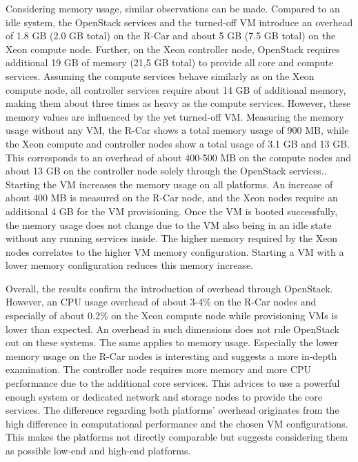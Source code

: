         \noindent Considering memory usage, similar observations can be made.
        Compared to an idle system, the OpenStack services and the turned-off VM introduce an overhead of 1.8 GB (2.0 GB total)  on the R-Car and about 5 GB (7.5 GB total) on the Xeon compute node.
        Further, on the Xeon controller node, OpenStack requires additional 19 GB of memory (21,5 GB total) to provide all core and compute services.
        Assuming the compute services behave similarly as on the Xeon compute node, all controller services require about 14 GB of additional memory, making them about three times as heavy as the compute services.
        However, these memory values are influenced by the yet turned-off \ac{VM}.
        Measuring the memory usage without any \ac{VM}, the R-Car shows a total memory usage of 900 MB, while the Xeon compute and controller nodes show a total usage of 3.1 GB and 13 GB.
        This corresponds to an overhead of about 400-500 MB on the compute nodes and about 13 GB on the controller node solely through the OpenStack services..
        Starting the \ac{VM} increases the memory usage on all platforms.
        An increase of about 400 MB is measured on the R-Car node, and the Xeon nodes require an additional 4 GB for the \ac{VM} provisioning. 
        Once the \ac{VM} is booted successfully, the memory usage does not change due to the \ac{VM} also being in an idle state without any running services inside.
        The higher memory required by the Xeon nodes correlates to the higher \ac{VM} memory configuration.
        Starting a VM with a lower memory configuration reduces this memory increase.
        
        \noindent Overall, the results confirm the introduction of overhead through OpenStack.
        However, an \ac{CPU} usage overhead of about 3-4\% on the R-Car nodes and especially of about 0.2\% on the Xeon compute node while provisioning \acp{VM} is lower than expected.
        An overhead in such dimensions does not rule OpenStack out on these systems.
        The same applies to memory usage. 
        Especially the lower memory usage on the R-Car nodes is interesting and suggests a more in-depth examination.
        The controller node requires more memory and more CPU performance due to the additional core services. 
        This advices to use a powerful enough system or dedicated network and storage nodes to provide the core services.
        The difference regarding both platforms' overhead originates from the high difference in computational performance and the chosen VM configurations.
        This makes the platforms not directly comparable but suggests considering them as possible low-end and high-end platforms.
        

